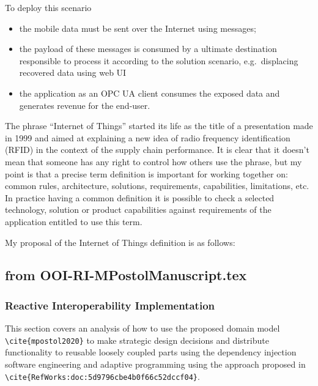 \documentclass[
]{article}
\providecommand{\tightlist}{%
  \setlength{\itemsep}{0pt}\setlength{\parskip}{0pt}}
\begin{document}
To deploy this scenario

\begin{itemize}
\tightlist
\item
  the mobile data must be sent over the Internet using messages;
\item
  the payload of these messages is consumed by a ultimate destination
  responsible to process it according to the solution scenario,
  e.g.~displacing recovered data using web UI
\item
  the application as an OPC UA client consumes the exposed data and
  generates revenue for the end-user.
\end{itemize}

The phrase ``Internet of Things'' started its life as the title of a
presentation made in 1999 and aimed at explaining a new idea of radio
frequency identification (RFID) in the context of the supply chain
performance. It is clear that it doesn't mean that someone has any right
to control how others use the phrase, but my point is that a precise
term definition is important for working together on: common rules,
architecture, solutions, requirements, capabilities, limitations, etc.
In practice having a common definition it is possible to check a
selected technology, solution or product capabilities against
requirements of the application entitled to use this term.

My proposal of the Internet of Things definition is as follows:

\hypertarget{from-ooi-ri-mpostolmanuscript.tex}{%
\subsection{from
OOI-RI-MPostolManuscript.tex}\label{from-ooi-ri-mpostolmanuscript.tex}}

\hypertarget{reactive-interoperability-implementation}{%
\subsubsection{Reactive Interoperability
Implementation}\label{reactive-interoperability-implementation}}

This section covers an analysis of how to use the proposed domain model
\texttt{\textbackslash{}cite\{mpostol2020\}} to make strategic design
decisions and distribute functionality to reusable loosely coupled parts
using the dependency injection software engineering and adaptive
programming using the approach proposed in
\texttt{\textbackslash{}cite\{RefWorks:doc:5d9796cbe4b0f66c52dccf04\}}.
\end{document}
